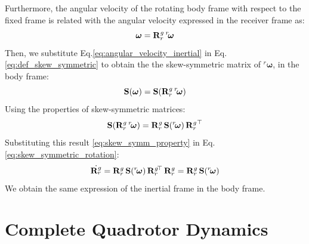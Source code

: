 \noindent
Furthermore, the angular velocity of the rotating body frame with respect to the fixed frame is related with the angular velocity
expressed in the receiver frame as:
\begin{equation}
     \boldsymbol{\omega} = \mathbf{R}^g_r \, {}^r\mkern-3mu\boldsymbol{\omega}
    \label{eq:angular_velocity_inertial}
\end{equation}
\noindent
Then, we substitute Eq.\ref{eq:angular_velocity_inertial} in Eq.\ref{eq:def_skew_symmetric} to obtain the 
the skew-symmetric matrix of ${}^r \boldsymbol{\omega}$, in the body frame:
\begin{equation}
    \mathbf{S}(\boldsymbol{\omega}) =  \mathbf{S}(\mathbf{R}^g_r \, {}^r\mkern-3mu\boldsymbol{\omega}) 
    \label{eq:S_body}
\end{equation}
\noindent
Using the properties of skew-symmetric matrices:
\begin{equation}
    \mathbf{S}(\mathbf{R}^g_r \, {}^r\mkern-3mu\boldsymbol{\omega}) = \mathbf{R}^g_r \, \mathbf{S}({}^r\mkern-3mu\boldsymbol{\omega}) \, {\mathbf{R}^g_r}^\top 
    \label{eq:skew_symm_property}
\end{equation}
Substituting this result \eqref{eq:skew_symm_property} in Eq.\ref{eq:skew_symmetric_rotation}:
\begin{equation}
    \dot{\mathbf{R}^g_r} = \mathbf{R}^g_r \, \mathbf{S}({}^r\mkern-3mu\boldsymbol{\omega}) \, {\mathbf{R}^g_r}\mkern-3mu^\top  \, \mathbf{R}^g_r = \mathbf{R}^g_r \, \mathbf{S}({}^r\mkern-3mu\boldsymbol{\omega})
    \label{eq:skew_symmetric_body}
\end{equation}
We obtain the same expression of the inertial frame in the body frame.

\section{Complete Quadrotor Dynamics}
